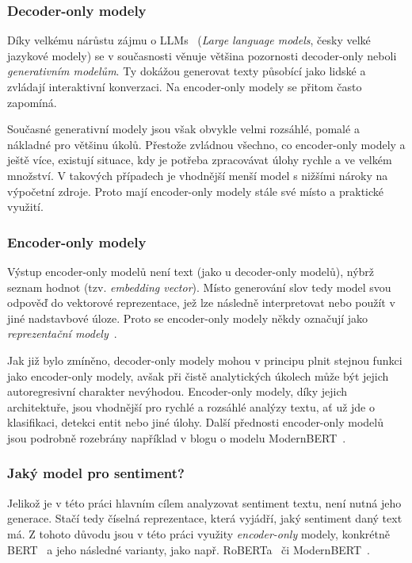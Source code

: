 \subsubsection{Decoder-only modely}
Díky velkému nárůstu zájmu o LLMs~\cite{minaee2025largelanguagemodelssurvey, naveed2024comprehensiveoverviewlargelanguage} (\emph{Large language models}, česky velké jazykové modely) se v současnosti věnuje většina pozornosti decoder-only neboli \emph{generativním modelům}. Ty dokážou generovat texty působící jako lidské a zvládají interaktivní konverzaci. Na encoder-only modely se přitom často zapomíná.~\cite{modernbertreplacment}

Současné generativní modely jsou však obvykle velmi rozsáhlé, pomalé a nákladné pro většinu úkolů. Přestože zvládnou všechno, co encoder-only modely a ještě více, existují situace, kdy je potřeba zpracovávat úlohy rychle a ve velkém množství. V takových případech je vhodnější menší model s nižšími nároky na výpočetní zdroje. Proto mají encoder-only modely stále své místo a praktické využití.~\cite{modernbertreplacment}

\subsubsection{Encoder-only modely}

Výstup encoder-only modelů není text (jako u decoder-only modelů), nýbrž seznam hodnot (tzv. \emph{embedding vector}). Místo generování slov tedy model svou odpověď  do vektorové reprezentace, jež lze následně interpretovat nebo použít v jiné nadstavbové úloze. Proto se encoder-only modely někdy označují jako \emph{reprezentační modely}~\cite{modernbertreplacment}.

Jak již bylo zmíněno, decoder-only modely mohou v principu plnit stejnou funkci jako encoder-only modely, avšak při čistě analytických úkolech může být jejich autoregresivní charakter nevýhodou. Encoder-only modely, díky jejich architektuře, jsou vhodnější pro rychlé a rozsáhlé analýzy textu, ať už jde o klasifikaci, detekci entit nebo jiné úlohy. Další přednosti encoder-only modelů jsou podrobně rozebrány například v blogu o modelu ModernBERT~\cite{modernbertreplacment}.

\subsubsection{Jaký model pro sentiment?}
Jelikož je v této práci hlavním cílem analyzovat sentiment textu, není nutná jeho generace. Stačí tedy číselná reprezentace, která vyjádří, jaký sentiment daný text má. Z tohoto důvodu jsou v této práci využity \emph{encoder-only} modely, konkrétně BERT~\cite{devlin2019bert} a jeho následné varianty, jako např. RoBERTa~\cite{liu2019robertarobustlyoptimizedbert} či ModernBERT~\cite{warner2024smarterbetterfasterlonger}.
